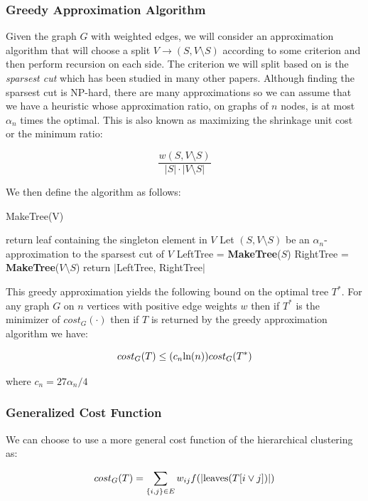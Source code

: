 \subsubsection{Greedy Approximation Algorithm}
Given the graph $G$ with weighted edges, we will consider an approximation algorithm that will choose a split $V \rightarrow (S, V \setminus S)$ according to some criterion and then perform recursion on each side. The criterion we will split based on is the \textit{sparsest cut} which has been studied in many other papers. Although finding the sparsest cut is NP-hard, there are many approximations so we can assume that we have a heuristic whose approximation ratio, on graphs of $n$ nodes, is at most $\alpha_n$ times the optimal. This is also known as maximizing the shrinkage unit cost or the minimum ratio:

$$ \frac{w(S, V \setminus S)}{|S| \cdot |V \setminus S|}$$

We then define the algorithm as follows:

\begin{algorithm}[H]
\caption{MakeTree(V)}

\begin{algorithmic}

     \STATE return leaf containing the singleton element in $V$
  \ENDIF
  \STATE Let $(S, V \setminus S)$ be an $\alpha_n$-approximation to the sparsest cut of $V$
  \STATE LeftTree = \textbf{MakeTree}($S$)
  \STATE RightTree = \textbf{MakeTree}($V \setminus S$)
  \STATE return $|$LeftTree, RightTree$|$
\end{algorithmic}
\end{algorithm}

This greedy approximation yields the following bound on the optimal tree $T^*$. For any graph $G$ on $n$ vertices with positive edge weights $w$ then if $T^*$ is the minimizer of $cost_G(\cdot)$ then if $T$ is returned by the greedy approximation algorithm we have:

$$cost_G(T) \leq (c_n \hbox{ln}(n)) cost_G(T^*)$$

where $c_n = 27\alpha_n/4$

\subsubsection{Generalized Cost Function}

We can choose to use a more general cost function of the hierarchical clustering as:

$$cost_G(T) = \sum_{\{i, j\} \in E}w_{ij}f(|\hbox{leaves}(T[i \vee j])|)$$


